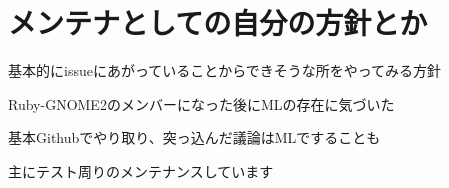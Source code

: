 \section{メンテナとしての自分の方針とか}

\begin{frame}
\begin{itemize}
{\Large
\item 基本的にissueにあがっていることからできそうな所をやってみる方針
\item Ruby-GNOME2のメンバーになった後にMLの存在に気づいた
\item 基本Githubでやり取り、突っ込んだ議論はMLですることも
\item 主にテスト周りのメンテナンスしています
}
\end{itemize}
\end{frame}
